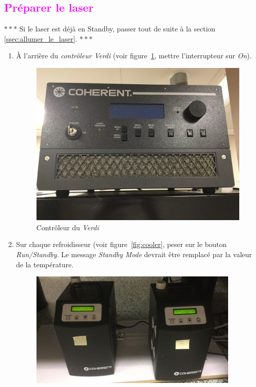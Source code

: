 \subsection{\textcolor{magenta}{Préparer le laser}}
\begin{center} $\ast\ast\ast$ Si le laser est déjà en Standby, passer tout de suite à la section \ref{ssec:allumer_le_laser}. $\ast\ast\ast$ \end{center}
\begin{enumerate}
    \item À l'arrière du \textit{contrôleur Verdi} (voir figure~\ref{fig:controleur-verdi}, mettre l'interrupteur sur \textit{On}).
        \begin{figure}[H]
        \centering
        \includegraphics[width=12cm]{controleur-verdi.jpg}
        \caption{Contrôleur du \textit{Verdi}}
        \label{fig:controleur-verdi}
        \end{figure}
    \item Sur chaque refroidisseur (voir figure~\ref{fig:cooler}, peser sur le bouton \textit{Run/Standby}. Le message \textit{Standby Mode} devrait être remplacé par la valeur de la température.
        \begin{figure}[H]
        \centering
        \includegraphics[width=10cm]{cooler.jpg}

\end{figure}
\end{enumerate}
